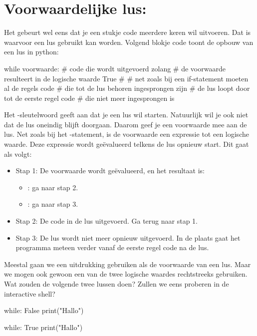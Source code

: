 \section{Voorwaardelijke lus: }
\label{sec:voorwaardelijke-lus}

Het gebeurt wel eens dat je een stukje code meerdere keren wil uitvoeren.
Dat is waarvoor een lus gebruikt kan worden.
Volgend blokje code toont de opbouw van een lus in python:
\begin{pyEnv}
	while voorwaarde:
		# code die wordt uitgevoerd zolang
		# de voorwaarde resulteert in de logische waarde True
		#
		# net zoals bij een if-statement moeten al de regels code
		# die tot de lus behoren ingesprongen zijn
		# de lus loopt door tot de eerste regel code
		# die niet meer ingesprongen is
\end{pyEnv}
Het -sleutelwoord geeft aan dat je een lus wil starten.
Natuurlijk wil je ook niet dat de lus oneindig blijft doorgaan.
Daarom geef je een voorwaarde mee aan de lus.
Net zoals bij het -statement,
is de voorwaarde een expressie tot een logische waarde.
Deze expressie wordt ge\"evalueerd telkens de lus opnieuw start.
Dit gaat als volgt:
\begin{itemize}
	\item
		Stap 1:
		\newline
		De voorwaarde wordt ge\"evalueerd, en het resultaat is:
		\begin{itemize}
			\item \true: ga naar stap 2.
			\item \true: ga naar stap 3.
		\end{itemize}
	\item
		Stap 2:
		\newline
		De code in de lus uitgevoerd.
		\newline
		Ga terug naar stap 1.
	\item
		Stap 3:
		\newline
		De lus wordt niet meer opnieuw uitgevoerd.
		In de plaats gaat het programma meteen verder vanaf de eerste regel code na de lus.
\end{itemize}

\begin{letsTryOut}
	Meestal gaan we een uitdrukking gebruiken als de voorwaarde van een lus.
	Maar we mogen ook gewoon een van de twee logische waardes rechtstreeks gebruiken.
	\newline
	Wat zouden de volgende twee lussen doen?
	Zullen we eens proberen in de interactive shell?
\begin{pyEnv}
while: False
	print("Hallo")
\end{pyEnv}
\begin{pyEnv}
while: True
	print("Hallo")
\end{pyEnv}
\end{letsTryOut}

